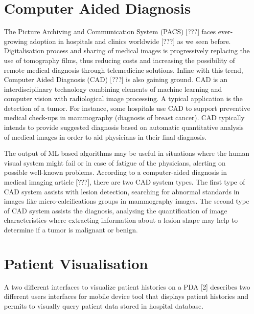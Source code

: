 \section{Computer Aided Diagnosis}

The Picture Archiving and Communication System (PACS) [???] faces ever-growing adoption in hospitals and clinics worldwide [???] as we seen before. Digitalisation process and sharing of medical images is progressively replacing the use of tomography films, thus reducing costs and increasing the possibility of remote medical diagnosis through telemedicine solutions. Inline with this trend, Computer Aided Diagnosis (CAD) [???] is also gaining ground. CAD is an interdisciplinary technology combining elements of machine learning and computer vision with radiological image processing. A typical application is the detection of a tumor. For instance, some hospitals use CAD to support preventive medical check-ups in mammography (diagnosis of breast cancer). CAD typically intends to provide suggested diagnosis based on automatic quantitative analysis of medical images in order to aid physicians in their final diagnosis.

\clearpage

The output of ML based algorithms may be useful in situations where the human visual system might fail or in case of fatigue of the physicians, alerting on possible well-known problems. According to a computer-aided diagnosis in medical imaging article [???], there are two CAD system types. The first type of CAD system assists with lesion detection, searching for abnormal standards in images like micro-calcifications groups in mammography images. The second type of CAD system assists the diagnosis, analysing the quantification of image characteristics where extracting information about a lesion shape may help to determine if a tumor is malignant or benign.

\section{Patient Visualisation}

A two different interfaces to visualize patient histories on a PDA [2] describes two different users interfaces for mobile device tool that displays patient histories and permits to visually query patient data stored in hospital database.

